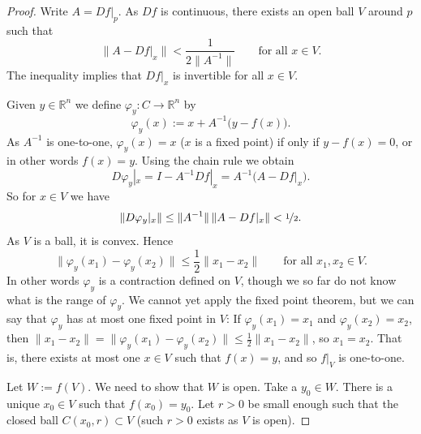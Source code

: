 \documentclass[12pt,openany]{book}
\newcommand{\snorm}[1]{\lVert {#1} \rVert}
\newcommand{\R}{{\mathbb{R}}}
\theoremstyle{plain}
\theoremstyle{remark}
\theoremstyle{definition}
\theoremstyle{exercise}
\theoremstyle{example}
\newcommand{\propref}[1]{\hyperref[#1]{Proposition~\ref*{#1}}}
\begin{document}
\begin{proof}
Write $A = Df|_p$.  As $Df$ is continuous, there exists an open ball
$V$ around $p$ such that
\begin{equation*}
\snorm{A-Df|_x} < \frac{1}{2\snorm{A^{-1}}}
\qquad \text{for all } x \in V.
\end{equation*}
The inequality implies that $Df|_x$ is invertible for all $x \in V$.

Given $y \in \R^n$ we define $\varphi_y \colon C \to \R^n$ by
\begin{equation*}
\varphi_y (x) := x + A^{-1}\bigl(y-f(x)\bigr) .
\end{equation*}
As $A^{-1}$ is one-to-one,
$\varphi_y(x) = x$ ($x$ is a fixed point) if only if
$y-f(x) = 0$, or in other words $f(x)=y$.  Using the chain rule we obtain
\begin{equation*}
D\varphi_y|_x = I - A^{-1} Df|_x = A^{-1} \bigl( A-Df|_x \bigr) .
\end{equation*}
So for $x \in V$ we have
\begin{equation*}
\snorm{D\varphi_y|_x} \leq \snorm{A^{-1}} \, \snorm{A-Df|_x} < \nicefrac{1}{2} .
\end{equation*}
As $V$ is a ball, it is convex.  Hence
\begin{equation*}
\snorm{\varphi_y(x_1)-\varphi_y(x_2)} \leq \frac{1}{2} \snorm{x_1-x_2} 
\qquad
\text{for all } x_1,x_2 \in V.
\end{equation*}
In other words $\varphi_y$ is a contraction defined on $V$, though we so far
do not know what is the range of $\varphi_y$.  We cannot yet
apply the fixed
point theorem, but we can say that $\varphi_y$ 
has at most one fixed point in $V$:
If $\varphi_y(x_1) = x_1$ and
$\varphi_y(x_2) = x_2$, then
$\snorm{x_1-x_2} = \snorm{\varphi_y(x_1)-\varphi_y(x_2)} \leq
\frac{1}{2} \snorm{x_1-x_2}$, so $x_1 = x_2$.
That is, there exists at most one $x \in V$
such that $f(x) = y$, and so $f|_V$ is one-to-one.

Let $W := f(V)$.  We need to show that $W$ is open.  Take a $y_0 \in W$.
There is a unique $x_0 \in V$ such that $f(x_0) = y_0$.
Let $r > 0$ be small enough such that the closed ball $C(x_0,r) \subset V$
(such $r > 0$ exists as $V$ is open).


\end{proof}
\end{document}

